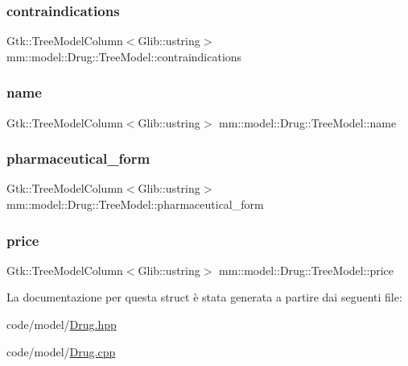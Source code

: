 \subsubsection{\texorpdfstring{contraindications}{contraindications}}
{\footnotesize\ttfamily Gtk\+::\+Tree\+Model\+Column$<$Glib\+::ustring$>$ mm\+::model\+::\+Drug\+::\+Tree\+Model\+::contraindications}

\mbox{\label{structmm_1_1model_1_1_drug_1_1_tree_model_a21ecd0c62d35f3a4f2e16253d5faa09c}} 
\subsubsection{\texorpdfstring{name}{name}}
{\footnotesize\ttfamily Gtk\+::\+Tree\+Model\+Column$<$Glib\+::ustring$>$ mm\+::model\+::\+Drug\+::\+Tree\+Model\+::name}

\mbox{\label{structmm_1_1model_1_1_drug_1_1_tree_model_a29443772824bbfc47d5c61e5e5c46050}} 
\subsubsection{\texorpdfstring{pharmaceutical\+\_\+form}{pharmaceutical\_form}}
{\footnotesize\ttfamily Gtk\+::\+Tree\+Model\+Column$<$Glib\+::ustring$>$ mm\+::model\+::\+Drug\+::\+Tree\+Model\+::pharmaceutical\+\_\+form}

\mbox{\label{structmm_1_1model_1_1_drug_1_1_tree_model_a89b06b1ccb81a349452bdb9273867269}} 
\subsubsection{\texorpdfstring{price}{price}}
{\footnotesize\ttfamily Gtk\+::\+Tree\+Model\+Column$<$Glib\+::ustring$>$ mm\+::model\+::\+Drug\+::\+Tree\+Model\+::price}



La documentazione per questa struct è stata generata a partire dai seguenti file\+:\begin{DoxyCompactItemize}
\item 
code/model/\mbox{\hyperlink{_drug_8hpp}{Drug.\+hpp}}\item 
code/model/\mbox{\hyperlink{_drug_8cpp}{Drug.\+cpp}}\end{DoxyCompactItemize}
